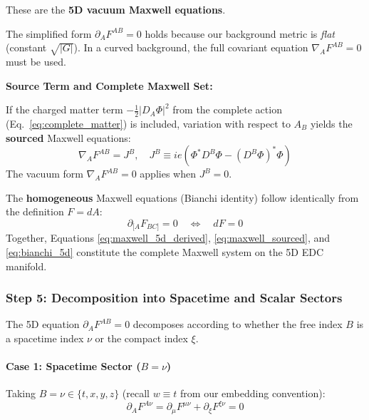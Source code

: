 These are the \textbf{5D vacuum Maxwell equations}. 

\begin{tcolorbox}[colback=yellow!5,colframe=yellow!60!black,title=Important Note]
The simplified form $\partial_A F^{AB} = 0$ holds because our background metric is \textit{flat} (constant $\sqrt{|G|}$). In a curved background, the full covariant equation $\nabla_A F^{AB} = 0$ must be used.
\end{tcolorbox}

\noindent\textbf{Source Term and Complete Maxwell Set:}

If the charged matter term $-\frac{1}{2}|D_A\Phi|^2$ from the complete action (Eq.~\ref{eq:complete_matter}) is included, variation with respect to $A_B$ yields the \textbf{sourced} Maxwell equations:
\begin{equation}
\nabla_A F^{AB} = J^B, \quad J^B \equiv ie \left( \Phi^* D^B \Phi - (D^B \Phi)^* \Phi \right)
\label{eq:maxwell_sourced}
\end{equation}
The vacuum form $\nabla_A F^{AB} = 0$ applies when $J^B = 0$.

The \textbf{homogeneous} Maxwell equations (Bianchi identity) follow identically from the definition $F = dA$:
\begin{equation}
\partial_{[A} F_{BC]} = 0 \quad \Leftrightarrow \quad dF = 0
\label{eq:bianchi_5d}
\end{equation}
Together, Equations \eqref{eq:maxwell_5d_derived}, \eqref{eq:maxwell_sourced}, and \eqref{eq:bianchi_5d} constitute the complete Maxwell system on the 5D EDC manifold.

\subsubsection{Step 5: Decomposition into Spacetime and Scalar Sectors}

The 5D equation $\partial_A F^{AB} = 0$ decomposes according to whether the free index $B$ is a spacetime index $\nu$ or the compact index $\xi$.

\paragraph{Case 1: Spacetime Sector ($B = \nu$)}

Taking $B = \nu \in \{t, x, y, z\}$ (recall $w \equiv t$ from our embedding convention):
\begin{equation}
\partial_A F^{A\nu} = \partial_\mu F^{\mu\nu} + \partial_\xi F^{\xi\nu} = 0
\end{equation}

